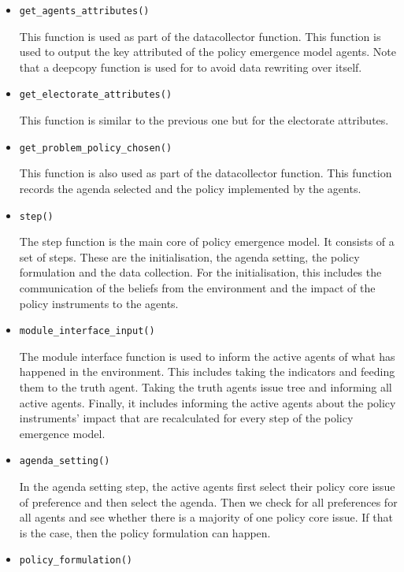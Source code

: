 \documentclass[11pt]{article}
\begin{document}
\begin{itemize}
\item \texttt{get\_agents\_attributes()}

This function is used as part of the datacollector function. This function is used to output the key attributed of the policy emergence model agents. Note that a deepcopy function is used for to avoid data rewriting over itself.

\item \texttt{get\_electorate\_attributes()}

This function is similar to the previous one but for the electorate attributes.

\item \texttt{get\_problem\_policy\_chosen()}

This function is also used as part of the datacollector function. This function records the agenda selected and the policy implemented by the agents.

\item \texttt{step()}

The step function is the main core of policy emergence model. It consists of a set of steps. These are the initialisation, the agenda setting, the policy formulation and the data collection. For the initialisation, this includes the communication of the beliefs from the environment and the impact of the policy instruments to the agents.

\item \texttt{module\_interface\_input()}

The module interface function is used to inform the active agents of what has happened in the environment. This includes taking the indicators and feeding them to the truth agent. Taking the truth agents issue tree and informing all active agents. Finally, it includes informing the active agents about the policy instruments' impact that are recalculated for every step of the policy emergence model.

\item \texttt{agenda\_setting()}

In the agenda setting step, the active agents first select their policy core issue of preference and then select the agenda. Then we check for all preferences for all agents and see whether there is a majority of one policy core issue. If that is the case, then the policy formulation can happen.
		
\item \texttt{policy\_formulation()}


\end{itemize}
\end{document}

